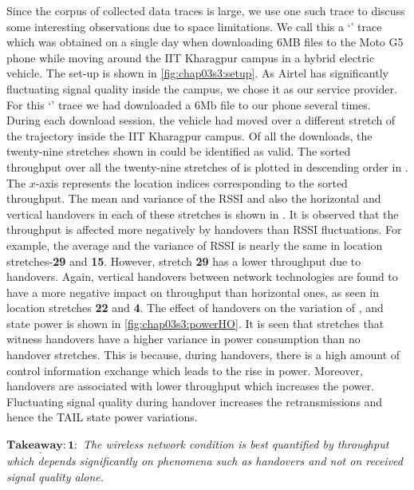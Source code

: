 \indent  Since the corpus of collected data traces is large, we use one such trace to discuss some interesting observations due to space limitations. We call this a `' trace which was obtained on a single day when downloading 6MB files to the Moto G5 phone while moving around the IIT Kharagpur campus in a hybrid electric vehicle. The set-up is shown in \fig\ref{fig:chap03s3:setup}. As Airtel has significantly fluctuating signal quality inside the campus, we chose it as our service provider.  For this `' trace we had downloaded a 6Mb file to our phone several times. During each download session, the vehicle had moved over a different stretch of the trajectory inside the IIT Kharagpur campus.  Of all the downloads, the twenty-nine stretches  shown in \fig{\ref{fig:chap03s3:technology_with_traj}} could be identified as valid. The sorted throughput over all the twenty-nine stretches of  \fig{\ref{fig:chap03s3:technology_with_traj}} is plotted in descending order in \fig{\ref{fig:chap03s3:thptHO}}. The $x$-axis represents the location indices corresponding to the sorted throughput. The mean and variance of the \ac{RSSI} and also the horizontal and vertical handovers in each of these stretches is shown in \fig{\ref{fig:chap03s3:thptHO}}.  It is observed that the throughput is affected more negatively by handovers than \ac{RSSI} fluctuations. For example, the average and the variance of \ac{RSSI} is nearly the same  in location stretches-\textbf{29} and \textbf{15}. However, stretch \textbf{29} has a lower throughput due to handovers. Again, vertical handovers between network technologies  are found to have a more negative impact on throughput than horizontal ones, as seen in location stretches {\bf 22}  and {\bf 4}.  The effect of handovers on the variation of ,  and  state power is shown in \fig\ref{fig:chap03s3:powerHO}. It is seen that stretches that witness handovers have a higher variance in  power consumption than no handover stretches. This is because, during handovers, there is a high amount of control information exchange which leads to the rise in  power. Moreover, handovers are associated with lower throughput which increases the  power. Fluctuating signal quality during handover increases the retransmissions and hence the TAIL state power variations.


$\mathrm{\mathbf{\underline{Takeaway:1}}}:$ \textit{The wireless network condition is best quantified by throughput which depends  significantly on phenomena such as handovers and not  on received signal quality alone.}

